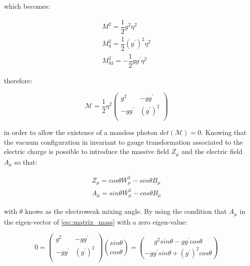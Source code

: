 which becomes:

\begin{equation}
\begin{array}{c}
M^{2}  = \dfrac{1}{2} g^{2} \eta^{2}\\
M_{0}^{2}  = \dfrac{1}{2} (g^{\prime})^{2} \eta^{2}\\
M_{03}^{2}  = -\dfrac{1}{2} gg^{\prime} \eta^{2}
\end{array}
\end{equation}

therefore:

\begin{equation}
\mathcal{M} =  \dfrac{1}{2} \eta^{2}
\begin{pmatrix}
 g^{2} & -gg^{\prime} \\
-gg^{\prime} & (g^{\prime})^{2} \\
\end{pmatrix}
\label{eq::matrix_mass}
\end{equation}

in order to allow the existence of a massless photon $det(\mathcal{M}) = 0$. Knowing that the vacuum configuration in invariant to gauge transformation associated to the electric charge is possible to introduce the massive field $Z_{\mu}$ and the electric field $A_{\mu}$ so that:

\begin{equation}
\begin{array}{c}
Z_{\mu} = cos\theta W^{3}_{\mu} - sin\theta B_{\mu}\\
A_{\mu} = sin\theta W^{3}_{\mu} - cos\theta B_{\mu}

\end{array}
\label{eq::fields_rotation}
\end{equation}

with $\theta$ knows as the electroweak mixing angle. By using the condition that $A_{\mu}$ in the eigen-vector of \ref{eq::matrix_mass} with a zero eigen-value:

\begin{equation}
0 = 
\begin{pmatrix}
g^{2} & -gg^{\prime} \\
-gg^{\prime} & (g^{\prime})^{2} \\
\end{pmatrix}
\binom{sin\theta}{cos\theta}
=
\binom{g^{2} sin\theta - gg^{\prime}cos\theta}{-gg^{\prime}sin\theta + (g^{\prime})^{2}cos\theta}
\label{eq::matrix_rotation}
\end{equation}

